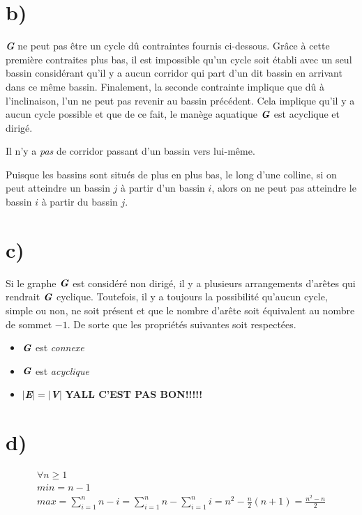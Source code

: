 \documentclass[11pt,a4paper, oneside, oldfontcommands]{memoir}
\newcommand{\G}{$\textbf{\textit{G}}$}
\newcommand{\V}{$\textbf{\textit{V}}$}
\newcommand{\E}{$\textbf{\textit{E}}$}
\begin{document}
\section{b)}
  \textbf{\textit{G}} ne peut pas être un cycle dû contraintes fournis ci-dessous. Grâce à cette première contraites plus bas, il est impossible qu'un cycle soit établi avec un seul bassin considérant qu'il y a aucun corridor qui part d'un dit bassin en arrivant dans ce même bassin. Finalement, la seconde contrainte implique que dû à l'inclinaison, l'un ne peut pas revenir au bassin précédent. Cela implique qu'il y a aucun cycle possible et que de ce fait, le manège aquatique \G{} est acyclique et dirigé.
  \begin{siderules}
    Il n'y a \textit{pas} de corridor passant d'un bassin vers lui-même.
  \end{siderules}
  \begin{siderules}
    Puisque les bassins sont situés de plus en plus bas, le long d'une colline, si on peut atteindre un bassin $j$ à partir d'un bassin $i$, alors on ne peut pas atteindre le bassin $i$ à partir du bassin $j$.
  \end{siderules}


\section{c)}
  Si le graphe \G{} est considéré non dirigé, il y a plusieurs arrangements d'arêtes qui rendrait \G{} cyclique. Toutefois, il y a toujours la possibilité qu'aucun cycle, simple ou non, ne soit présent et que le nombre d'arête soit équivalent au nombre de sommet $- 1$. De sorte que les propriétés suivantes soit respectées.
  \begin{itemize}
    \item \G{} est \textit{connexe}
    \item \G{} est \textit{acyclique}
    \item $|\E{}|=|\V{}|$ \textbf{YALL C'EST PAS BON!!!!!}
  \end{itemize}

\section{d)}
  \begin{gather*}
    \forall n \geq 1\quad\\
    min = n-1\quad\\
    max = \sum_{i=1}^{n} {n-i}=\sum_{i=1}^{n} {n}-\sum_{i=1}^{n} {i}=n^{2}-\frac{n}{2}(n+1)=\frac{n^{2}-n}{2}
  \end{gather*}
\end{document}

